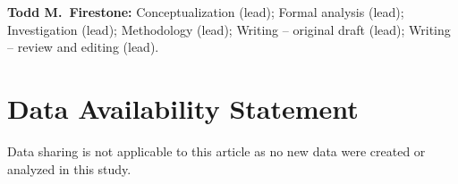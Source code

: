 \documentclass[aip,jmp,amsmath,amssymb,reprint,author-year]{revtex4-2}
\begin{document}
\textbf{Todd M.\ Firestone:} Conceptualization (lead); Formal analysis
(lead); Investigation (lead); Methodology (lead); Writing -- original
draft (lead); Writing -- review and editing (lead).

\section*{Data Availability Statement}

Data sharing is not applicable to this article as no new data were
created or analyzed in this study.



\end{document}
